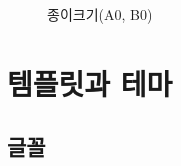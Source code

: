 \documentclass[
  letterpaper,
]{book}
\begin{document}
\begin{figure}
\begin{minipage}[t]{0.47\linewidth}
{\centering 


}

\end{minipage}%

\caption{\label{fig-paper-size}종이크기(A0, B0)}

\end{figure}

\part{템플릿과 테마}

\hypertarget{uxae00uxaf34}{%
\chapter{글꼴}\label{uxae00uxaf34}}
\end{document}
